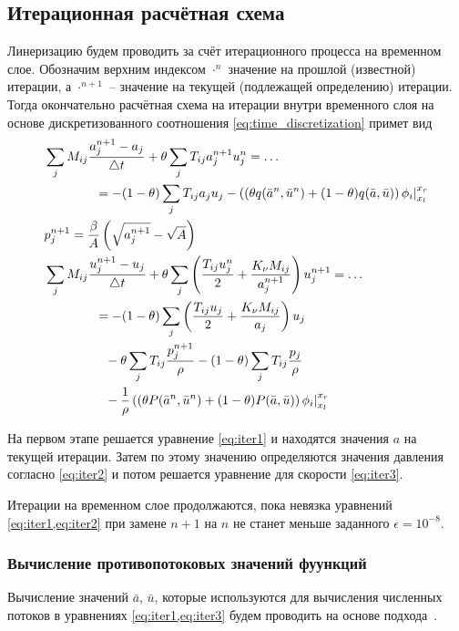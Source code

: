 \subsection{Итерационная расчётная схема}
Линеризацию будем проводить за счёт итерационного процесса на временном слое.
Обозначим верхним индексом $\cdot^{n}$ значение на прошлой (известной) итерации,
а $\cdot^{n+1}$ -- значение на текущей (подлежащей определению) итерации.
Тогда окончательно расчётная схема на итерации внутри временного слоя 
на основе дискретизованного соотношения \cref{eq:time_discretization}
примет вид
\begin{align}
&
\label{eq:iter1}
\sum\limits_j M_{ij} \frac{a^{n+1}_j - a_j}{\triangle t} + \theta\sum\limits_j T_{ij} a_j^{n+1} u_j^{n} = \ldots
\\
&
\nonumber
\qquad\qquad
= -(1 - \theta)\sum\limits_j T_{ij}a_j u_j
- \left(\left(\theta q(\bar a^n, \bar u^n) + (1-\theta)q(\bar a,\bar u)\right)\phi_i\right|_{x_l}^{x_r} \\
\label{eq:iter2}
&
p_j^{n+1} = \frac{\beta}{A}\left(\sqrt{a_j^{n+1}} - \sqrt{A}\right)\\
& 
\label{eq:iter3}
\sum\limits_j M_{ij} \frac{u^{n+1}_j - u_j}{\triangle t} + 
\theta\sum\limits_j\left(
\frac{T_{ij}u_j^{n}}{2} + \frac{K_\nu M_{ij}}{a_j^{n+1}}
\right)u_j^{n+1} = \dots
\\
&
\nonumber
\qquad\qquad
= -(1 - \theta)
\sum\limits_j\left(
\frac{T_{ij}u_j}{2} + \frac{K_\nu M_{ij}}{a_j}
\right)u_j
\\
&
\nonumber
\qquad\qquad
\phantom{=}
-\theta \sum\limits_j T_{ij} \frac{p^{n+1}_j}{\rho}
-(1 - \theta) \sum\limits_j T_{ij} \frac{p_j}{\rho}
\\
&
\nonumber
\qquad\qquad
\phantom{=}
-\frac1\rho\left(\left(\theta P(\bar a^n, \bar u^n) + (1-\theta)P(\bar a,\bar u)\right)\phi_i\right|_{x_l}^{x_r}
\end{align}

На первом этапе решается уравнение \cref{eq:iter1} и находятся значения $a$ на
текущей итерации. Затем по этому значению определяются значения давления согласно \cref{eq:iter2}
и потом решается уравнение для скорости \cref{eq:iter3}.

Итерации на временном слое продолжаются, пока невязка уравнений
\cref{eq:iter1,eq:iter2} при замене $n+1$ на $n$ не станет меньше
заданного $\epsilon=10^{-8}$.

\subsubsection{Вычисление противопотоковых значений фуункций}
Вычисление значений $\bar a$, $\bar u$, которые используются для вычисления
численных потоков в уравнениях \cref{eq:iter1,eq:iter3} будем проводить на основе подхода~\cite{Sherwin2003}.

